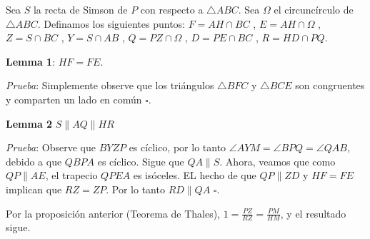 \begin{sol}
	Sea $S$ la recta de Simson de $P$ con respecto a $\triangle ABC$. Sea $\Omega$ el circunc\'irculo de $\triangle ABC$. Definamos los siguientes puntos: $F = AH \cap BC$ , $ E = AH \cap \Omega$ , $ Z = S \cap BC$ , $ Y = S \cap AB$ , $ Q = PZ \cap \Omega$ , $ D = PE \cap BC$ , $ R = HD \cap PQ$.
	
	\textbf{Lemma 1}: $HF = FE$. 
	
	\textit{Prueba}: Simplemente observe que los tri\'angulos $\triangle BFC$ y $\triangle BCE$ son congruentes y comparten un lado en com\'un $\square$.
	
	\textbf{Lemma 2} $S \parallel AQ \parallel HR$ 
	
	\textit{Prueba}: Observe que $BYZP$ es c\'iclico, por lo tanto $\angle AYM = \angle BPQ = \angle QAB$, debido a que $QBPA$ es c\'iclico. Sigue que $QA \parallel S$. Ahora, veamos que como $QP \parallel AE$, el trapecio $QPEA$ es is\'oceles. EL hecho de que $QP \parallel ZD$ y $HF = FE$ implican que $RZ =ZP$. Por lo tanto $RD \parallel QA$ $\square$.
	
	Por la proposici\'on anterior (Teorema de Thales), $1= \frac{PZ}{RZ} = \frac{PM}{HM}$, y el resultado sigue.
\end{sol}

